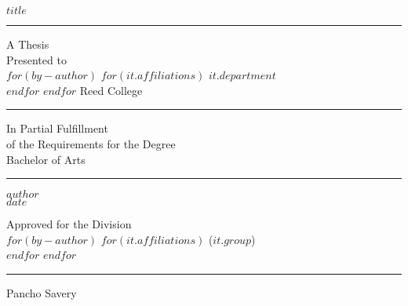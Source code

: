 %
%
%
%
%
%
%


\frontmatter
{}  %
\begin{center}
    $title$
    \vfil
    \hrule
    \vfil
    A Thesis \\
    Presented to \\
    $for(by-author)$
    $for(it.affiliations)$
    $it.department$ \\ %
    $endfor$
    $endfor$
    Reed College
    \vfil
    \hrule
    \vfil
    In Partial Fulfillment \\
    of the Requirements for the Degree \\
    Bachelor of Arts
    \vfil
    \hrule
    \vfil
    $author$ \\
    $date$
    
    \cleardoublepage
    
    \vfil
    Approved for the Division \\
    $for(by-author)$
    $for(it.affiliations)$
    ($it.group$) \\
    $endfor$
    $endfor$
    
    \bigskip
    \bigskip
    \bigskip
    \hrule
    
    \medskip
    Pancho Savery
    \vfil
\end{center}

